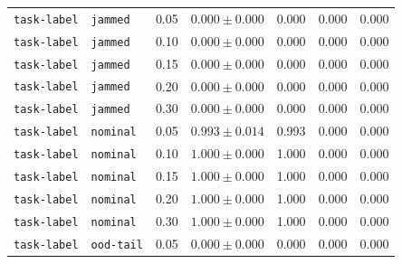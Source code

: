 \documentclass{article}
\begin{document}
\begin{center}
\begin{tabular}{lllcccc}
\texttt{task-label} & \texttt{jammed} & 0.05 & $0.000 \pm 0.000$ & 0.000 & 0.000 & 0.000 \\
\texttt{task-label} & \texttt{jammed} & 0.10 & $0.000 \pm 0.000$ & 0.000 & 0.000 & 0.000 \\
\texttt{task-label} & \texttt{jammed} & 0.15 & $0.000 \pm 0.000$ & 0.000 & 0.000 & 0.000 \\
\texttt{task-label} & \texttt{jammed} & 0.20 & $0.000 \pm 0.000$ & 0.000 & 0.000 & 0.000 \\
\texttt{task-label} & \texttt{jammed} & 0.30 & $0.000 \pm 0.000$ & 0.000 & 0.000 & 0.000 \\
\texttt{task-label} & \texttt{nominal} & 0.05 & $0.993 \pm 0.014$ & 0.993 & 0.000 & 0.000 \\
\texttt{task-label} & \texttt{nominal} & 0.10 & $1.000 \pm 0.000$ & 1.000 & 0.000 & 0.000 \\
\texttt{task-label} & \texttt{nominal} & 0.15 & $1.000 \pm 0.000$ & 1.000 & 0.000 & 0.000 \\
\texttt{task-label} & \texttt{nominal} & 0.20 & $1.000 \pm 0.000$ & 1.000 & 0.000 & 0.000 \\
\texttt{task-label} & \texttt{nominal} & 0.30 & $1.000 \pm 0.000$ & 1.000 & 0.000 & 0.000 \\
\texttt{task-label} & \texttt{ood-tail} & 0.05 & $0.000 \pm 0.000$ & 0.000 & 0.000 & 0.000 \\
\bottomrule
\end{tabular}
\end{center}
\end{document}
